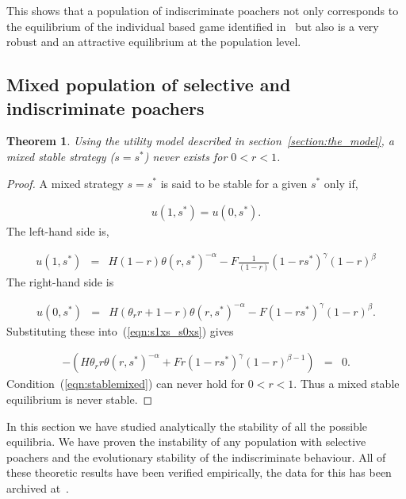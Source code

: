 \documentclass[10pt]{article}
\newtheorem{theorem}{Theorem}
\begin{document}
This shows that a population of indiscriminate poachers
not only corresponds to the equilibrium of the individual based
game identified in~\cite{Lee} but also is a very robust and an attractive
equilibrium at the population level.

\subsection{Mixed population of selective and indiscriminate poachers}

\begin{theorem}\label{theorem:mixed}
Using the utility model described in section~\ref{section:the_model}, a mixed
stable strategy (\(s=s^*\)) never exists for \(0 < r <1\).  
\end{theorem}

\begin{proof}
    A mixed strategy \(s = s^*\) is said to be stable for a
    given \(s^*\) only if,

    \begin{eqnarray}
    \label{eqn:s1xs_s0xs}
    u(1,s^*) = u(0,s^*).
    \end{eqnarray}
    The left-hand side is,

    \begin{eqnarray} \nonumber
    u(1,s^*)&=&
    H(1 - r) \theta(r, s^*)^{-\alpha} - F \frac{1}{(1 - r)}(1 - rs^*)^{\gamma}(1 - r)^{\beta} 
    \end{eqnarray}
    The right-hand side is

    \begin{eqnarray} \nonumber
    u(0,s^*)&=&
    H(\theta_rr + 1 - r)\theta(r, s^*)^{-\alpha} - F(1 - rs^*)^{\gamma}(1 - r)^{\beta}.
    \end{eqnarray}
    Substituting these into~(\ref{eqn:s1xs_s0xs}) gives

    \begin{eqnarray}
    \label{eqn:stablemixed}
            - (H \theta_r r \theta(r, s^*)^{-\alpha}  + F  r(1 - rs^*)^{\gamma}(1 - r)^{\beta - 1})&=& 0.
            \end{eqnarray}
    Condition~(\ref{eqn:stablemixed}) can never hold for \(0 < r <1\).
    Thus a mixed stable equilibrium is never stable.
\end{proof}

In this section we have studied analytically the stability of all the possible
equilibria. We have proven the instability of any population with selective
poachers
and the evolutionary stability of the indiscriminate behaviour.
All of these theoretic results have been verified empirically, the data for this
has been archived at~\cite{}.
\end{document}
